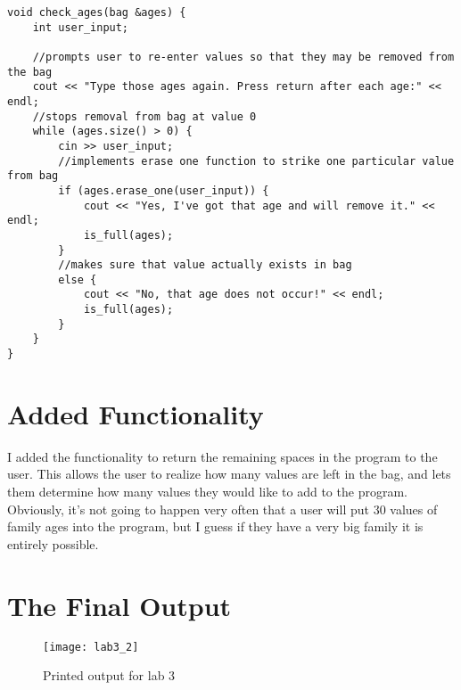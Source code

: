 \documentclass[11pt]{article}
\begin{document}
\begin{lstlisting}
void check_ages(bag &ages) {
    int user_input;

    //prompts user to re-enter values so that they may be removed from the bag
    cout << "Type those ages again. Press return after each age:" << endl;
    //stops removal from bag at value 0
    while (ages.size() > 0) {
        cin >> user_input;
        //implements erase one function to strike one particular value from bag
        if (ages.erase_one(user_input)) {
            cout << "Yes, I've got that age and will remove it." << endl;
            is_full(ages);
        }
        //makes sure that value actually exists in bag
        else {
            cout << "No, that age does not occur!" << endl;
            is_full(ages);
        }
    }
}
\end{lstlisting}

\section{Added Functionality}
I added the functionality to return the remaining spaces in the program to the user. This allows the user to realize how many values are left in the bag, and lets them determine how many values they would like to add to the program. Obviously, it's not going to happen very often that a user will put 30 values of family ages into the program, but I guess if they have a very big family it is entirely possible. 

\newpage
\section{The Final Output}
\begin{figure}[H]
\centering
\texttt{[image: lab3\_2]}
\caption{Printed output for lab 3}
\end{figure}
\end{document}
